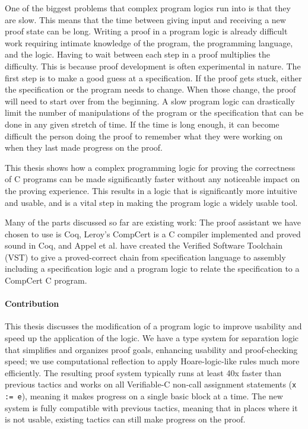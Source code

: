 \documentclass{puthesis}
\begin{document}
One of the biggest problems that complex program logics run into is
that they are slow. This means that the time between giving input and
receiving a new proof state can be long. Writing a proof in a program
logic is already difficult work requiring intimate knowledge of the
program, the programming language, and the logic. Having to wait
between each step in a proof multiplies the difficulty.  This is
because proof development is often experimental in nature. The first
step is to make a good guess at a specification. If the proof gets
stuck, either the specification or the program needs to change. When
those change, the proof will need to start over from the beginning. A
slow program logic can drastically limit the number of manipulations
of the program or the specification that can be done in any given
stretch of time. If the time is long enough, it can become difficult
the person doing the proof to remember what they were working on when
they last made progress on the proof.

This thesis shows how a complex programming logic for proving the
correctness of C programs can be made significantly faster without any
noticeable impact on the proving experience. This results in a logic
that is significantly more intuitive and usable, and is a vital step
in making the program logic a widely usable tool.

Many of the parts discussed so far are existing work: The proof
assistant we have chosen to use is Coq, Leroy's CompCert
\cite{Leroy-Compcert-CACM} is a C compiler implemented and proved
sound in Coq, and Appel et al. \cite{appel14:plcc} have created the
Verified Software Toolchain (VST) to give a proved-correct chain from
specification language to assembly including a specification logic and
a program logic to relate the specification to a CompCert C program.

\paragraph{Contribution}
This thesis discusses the modification of a program logic to improve
usability and speed up the application of the logic. We have a type
system for separation logic that simplifies and organizes proof goals,
enhancing usability and proof-checking speed; we use computational
reflection to apply Hoare-logic-like rules much more efficiently.  The
resulting proof system typically runs at least 40x faster than
previous tactics and works on all Verifiable-C non-call assignment
statements (\lstinline|x := e|), meaning it makes progress on a single
basic block at a time. The new system is fully compatible with previous
tactics, meaning that in places where it is not usable, existing
tactics can still make progress on the proof.
\end{document}
